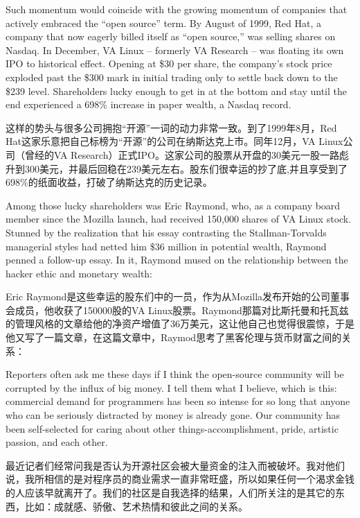 \ifdefined\eng
Such momentum would coincide with the growing momentum of companies that actively embraced the ``open source'' term. By August of 1999, Red Hat, a company that now eagerly billed itself as ``open source,'' was selling shares on Nasdaq. In December, VA Linux -- formerly VA Research -- was floating its own IPO to historical effect. Opening at \$30 per share, the company's stock price exploded past the \$300 mark in initial trading only to settle back down to the \$239 level. Shareholders lucky enough to get in at the bottom and stay until the end experienced a 698\% increase in paper wealth, a Nasdaq record.
\fi

\ifdefined\chs
这样的势头与很多公司拥抱``开源''一词的动力非常一致。到了1999年8月，Red Hat这家乐意把自己标榜为``开源''的公司在纳斯达克上市。同年12月，VA Linux公司（曾经的VA Research）正式IPO。这家公司的股票从开盘的30美元一股一路彪升到300美元，并最后回稳在239美元左右。股东们很幸运的抄了底,并且享受到了698\%的纸面收益，打破了纳斯达克的历史记录。
\fi

\ifdefined\eng
Among those lucky shareholders was Eric Raymond, who, as a company board member since the Mozilla launch, had received 150,000 shares of VA Linux stock. Stunned by the realization that his essay contrasting the Stallman-Torvalds managerial styles had netted him \$36 million in potential wealth, Raymond penned a follow-up essay. In it, Raymond mused on the relationship between the hacker ethic and monetary wealth:
\fi

\ifdefined\chs
Eric Raymond是这些幸运的股东们中的一员，作为从Mozilla发布开始的公司董事会成员，他收获了150000股的VA Linux股票。Raymond那篇对比斯托曼和托瓦兹的管理风格的文章给他的净资产增值了36万美元，这让他自己也觉得很震惊，于是他又写了一篇文章，在这篇文章中，Raymod思考了黑客伦理与货币财富之间的关系：
\fi

\ifdefined\eng
Reporters often ask me these days if I think the open-source community will be corrupted by the influx of big money. I tell them what I believe, which is this: commercial demand for programmers has been so intense for so long that anyone who can be seriously distracted by money is already gone. Our community has been self-selected for caring about other things-accomplishment, pride, artistic passion, and each other.\endnote{}
\fi

\ifdefined\chs
最近记者们经常问我是否认为开源社区会被大量资金的注入而被破坏。我对他们说，我所相信的是对程序员的商业需求一直非常旺盛，所以如果任何一个渴求金钱的人应该早就离开了。我们的社区是自我选择的结果，人们所关注的是其它的东西，比如：成就感、骄傲、艺术热情和彼此之间的关系。\endnote{}
\fi

